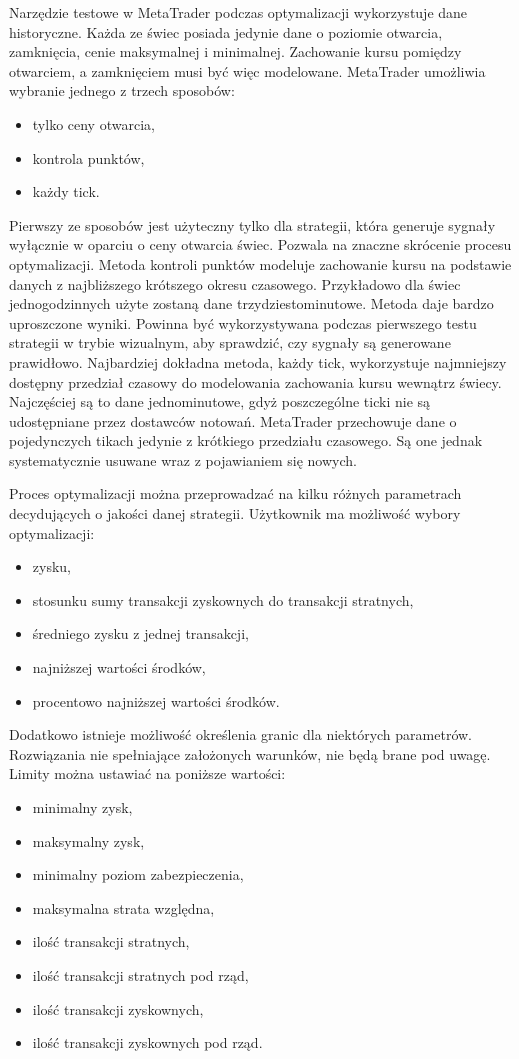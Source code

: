 \documentclass[pdflatex,11pt]{aghdpl}
\begin{document}
Narzędzie testowe w MetaTrader podczas optymalizacji wykorzystuje dane historyczne. Każda ze świec posiada jedynie dane o poziomie otwarcia, zamknięcia, cenie maksymalnej i minimalnej. Zachowanie kursu pomiędzy otwarciem, a zamknięciem musi być więc modelowane. MetaTrader umożliwia wybranie jednego z trzech sposobów:
\begin{itemize}
\item tylko ceny otwarcia,
\item kontrola punktów,
\item każdy tick.
\end{itemize}
Pierwszy ze sposobów jest użyteczny tylko dla strategii, która generuje sygnały wyłącznie w oparciu o ceny otwarcia świec. Pozwala na znaczne skrócenie procesu optymalizacji. Metoda kontroli punktów modeluje zachowanie kursu na podstawie danych z najbliższego krótszego okresu czasowego. Przykładowo dla świec jednogodzinnych użyte zostaną dane trzydziestominutowe. Metoda daje bardzo uproszczone wyniki. Powinna być wykorzystywana podczas pierwszego testu strategii w trybie wizualnym, aby sprawdzić, czy sygnały są generowane prawidłowo. Najbardziej dokładna metoda, każdy tick, wykorzystuje najmniejszy dostępny przedział czasowy do modelowania zachowania kursu wewnątrz świecy. Najczęściej są to dane jednominutowe, gdyż poszczególne ticki nie są udostępniane przez dostawców notowań. MetaTrader przechowuje dane o pojedynczych tikach jedynie z krótkiego przedziału czasowego. Są one jednak systematycznie usuwane wraz z pojawianiem się nowych.

Proces optymalizacji można przeprowadzać na kilku różnych parametrach decydujących o jakości danej strategii. Użytkownik ma możliwość wybory optymalizacji:
\begin{itemize}
\item zysku,
\item stosunku sumy transakcji zyskownych do transakcji stratnych,
\item średniego zysku z jednej transakcji,
\item najniższej wartości środków,
\item procentowo najniższej wartości środków.
\end{itemize}
Dodatkowo istnieje możliwość określenia granic dla niektórych parametrów. Rozwiązania nie spełniające założonych warunków, nie będą brane pod uwagę. Limity można ustawiać na poniższe wartości: 
\begin{itemize}
\item minimalny zysk,
\item maksymalny zysk,
\item minimalny poziom zabezpieczenia,
\item maksymalna strata względna,
\item ilość transakcji stratnych,
\item ilość transakcji stratnych pod rząd,
\item ilość transakcji zyskownych,
\item ilość transakcji zyskownych pod rząd.
\end{itemize}
\end{document}
